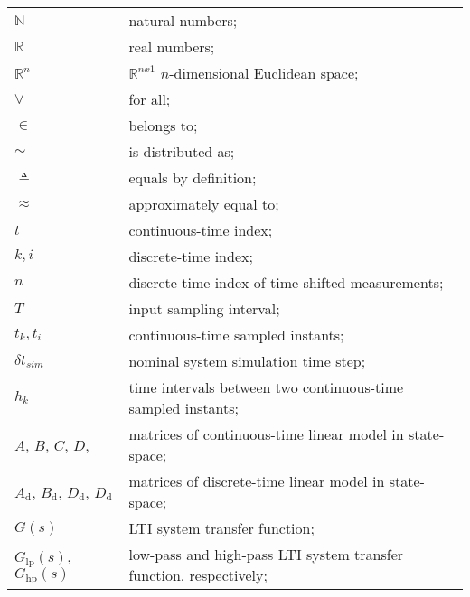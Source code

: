 \begin{longtable}{ll}
	
	$\mathbb{N}$			& natural numbers; \\
	$\mathbb{R}$ 			& real numbers; \\
	$\mathbb{R}^n$			& $\mathbb{R}^{nx1}$ $n$-dimensional Euclidean space; \\
	
	$\forall$				& for all; \\
	$\in$					& belongs to; \\
	$\sim$					& is distributed as; \\
	$\triangleq$			& equals by definition; \\	
	$\approx$				& approximately equal to; \\
	
	$t$						& continuous-time index; \\
	$k, i$					& discrete-time index;  \\
	$n$						& discrete-time index of time-shifted measurements;  \\
	$T$						& input sampling interval; \\
	$t_k, t_i$				& continuous-time sampled instants; \\
	$\delta t_{sim}$		& nominal system simulation time step; \\
	$h_k$					& time intervals between two continuous-time sampled instants; \\
	$A$, $B$, $C$, $D$,		& matrices of continuous-time linear model in state-space;  \\
	$A_{\textrm{d}}$,
	$B_{\textrm{d}}$,
	$D_{\textrm{d}}$,
	$D_{\textrm{d}}$		& matrices of discrete-time linear model in state-space;  \\
	
	$G(s)$					& LTI system transfer function; \\
	$G_{\textrm{lp}}(s)$,
	$G_{\textrm{hp}}(s)$	& low-pass and high-pass LTI system transfer function, respectively; \\


\end{longtable}
